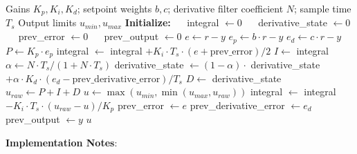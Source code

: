 \begin{algorithm}[H]
\caption{Discrete-Time 2DOF-PID Controller}
\label{alg:pid_controller}
\begin{algorithmic}[1]
\REQUIRE Gains $K_p, K_i, K_d$; setpoint weights $b, c$; derivative filter coefficient $N$; sample time $T_s$
\REQUIRE Output limits $u_{min}, u_{max}$
\STATE \textbf{Initialize:}
\STATE $\quad$ integral $\gets 0$
\STATE $\quad$ derivative\_state $\gets 0$
\STATE $\quad$ prev\_error $\gets 0$
\STATE $\quad$ prev\_output $\gets 0$
\STATE
{}
    \STATE {}
    \STATE $e \gets r - y$ 
    \STATE $e_p \gets b \cdot r - y$ 
    \STATE $e_d \gets c \cdot r - y$ 
    \STATE
    \STATE {}
    \STATE $P \gets K_p \cdot e_p$
    \STATE
    \STATE {}
    \STATE integral $\gets$ integral $+ K_i \cdot T_s \cdot (e + \text{prev\_error}) / 2$
    \STATE $I \gets$ integral
    \STATE
    \STATE {}
    \STATE $\alpha \gets N \cdot T_s / (1 + N \cdot T_s)$
    \STATE derivative\_state $\gets (1 - \alpha) \cdot$ derivative\_state $+ \alpha \cdot K_d \cdot (e_d - \text{prev\_derivative\_error}) / T_s$
    \STATE $D \gets$ derivative\_state
    \STATE
    \STATE {}
    \STATE $u_{raw} \gets P + I + D$
    \STATE
    \STATE {}
    \STATE $u \gets \max(u_{min}, \min(u_{max}, u_{raw}))$
    \STATE
    \STATE {}
        \STATE integral $\gets$ integral $- K_i \cdot T_s \cdot (u_{raw} - u) / K_p$
    \ENDIF
    \STATE
    \STATE {}
    \STATE prev\_error $\gets e$
    \STATE prev\_derivative\_error $\gets e_d$
    \STATE prev\_output $\gets y$
    \STATE
    \RETURN $u$
\ENDFUNCTION
\end{algorithmic}
\end{algorithm}

\textbf{Implementation Notes}:

